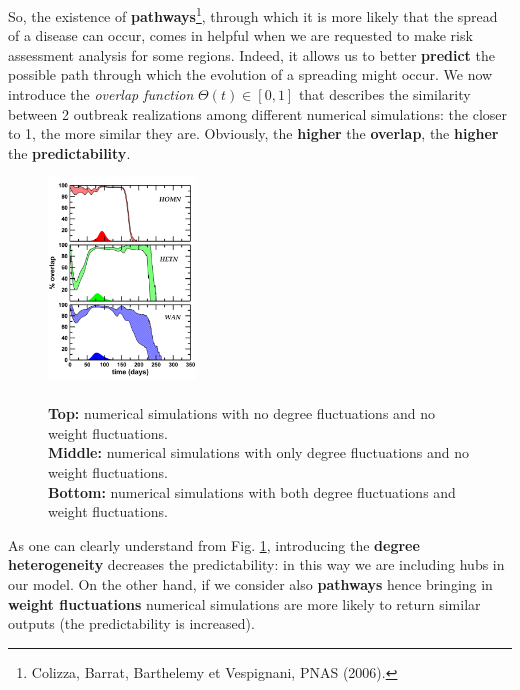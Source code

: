 \documentclass[../main/main.tex]{subfiles}
\begin{document}
So, the existence of \textbf{pathways}\footnote{Colizza, Barrat, Barthelemy et Vespignani, PNAS (2006).}, through which it is more likely that the spread of a disease can occur, comes in helpful when we are requested to make risk assessment analysis for some regions.
Indeed, it allows us to better \textbf{predict} the possible path through which the evolution of a spreading might occur. We now introduce the \textit{overlap function} $\Theta(t) \in [0,1]$ that describes the similarity between 2 outbreak realizations among different numerical simulations: the closer to 1, the more similar they are. Obviously, the \textbf{higher} the \textbf{overlap}, the \textbf{higher} the \textbf{predictability}.

\begin{figure}[h!]
\centering
\includegraphics[width=0.35\textwidth]{../lessons/image/15/image04.png}
\caption{\label{fig:14_04}\\ \textbf{Top:} numerical simulations with no degree fluctuations and no weight fluctuations. \\ \textbf{Middle:} numerical simulations with only degree fluctuations and no weight fluctuations. \\ \textbf{Bottom:} numerical simulations with both degree fluctuations and weight fluctuations.}
\end{figure}

As one can clearly understand from Fig. \ref{fig:14_04}, introducing the \textbf{degree heterogeneity} decreases the predictability: in this way we are including hubs in our model. On the other hand, if we consider also \textbf{pathways} hence bringing in \textbf{weight fluctuations} numerical simulations are more likely to return similar outputs (the predictability is increased).
\end{document}

